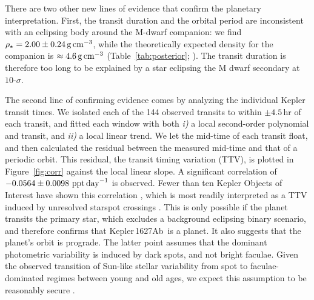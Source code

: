 \documentclass[12pt,modern,twocolumn,tighten]{aastex63}
\newcommand{\pn}{Kepler\,1627Ab} %
\begin{document}
There are two other new lines of evidence that confirm the planetary
interpretation.  First, the transit duration and the orbital period
are inconsistent with an eclipsing body around the M-dwarf companion:
we find $\rho_\star = 2.00 \pm 0.24\,{\rm g\,cm}^{-3}$, while the
theoretically expected density for the companion is $\approx 4.6\,{\rm
g\,cm}^{-3}$ (Table~\ref{tab:posterior}; \citealt{choi_mesa_2016}).
The transit duration is therefore too long to be explained by a star
eclipsing the M dwarf secondary at $10$-$\sigma$.


The second line of confirming evidence comes by analyzing the
individual Kepler transit times. We isolated each of the 144 observed
transits to within $\pm4.5$\,hr of each transit, and fitted each
window with both {\it i)} a local second-order polynomial and transit,
and {\it ii)} a local linear trend.  We let the mid-time of each
transit float, and then calculated the residual between the measured
mid-time and that of a periodic orbit.  This residual, the transit
timing variation (TTV), is plotted in Figure~\ref{fig:corr}
against the local linear slope.  A significant correlation of $-0.0564
\pm 0.0098\ {\rm ppt\,day}^{-1}$ is observed.  Fewer than ten Kepler
Objects of Interest have shown this correlation
\citep{holczer_time_2015}, which is most readily interpreted as a TTV
induced by unresolved starspot crossings \citep{mazeh_time_2015}.
This is only possible if the planet transits the primary star, which
excludes a background eclipsing binary scenario, and therefore
confirms that \pn\ is a planet.  It also suggests that the planet's
orbit is prograde.  The latter point assumes that the dominant
photometric variability is induced by dark spots, and not bright
faculae.  Given the observed transition of Sun-like stellar
variability from spot to faculae-dominated regimes between young and
old ages, we expect this assumption to be reasonably secure
\citep{shapiro_are_2016,montet_long-term_2017,reinhold_stellar_2020}.
\end{document}
